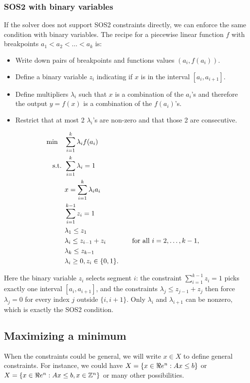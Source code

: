 \subsubsection{SOS2 with binary variables}

If the solver does not support SOS2 constraints directly, we can enforce the same condition with binary variables.  The recipe for a piecewise linear function $f$ with breakpoints $a_1 < a_2 < \dots < a_k$ is:
\begin{itemize}
\item Write down pairs of breakpoints and functions values $(a_i, f(a_i))$.
\item Define a binary variable $z_i$ indicating if $x$ is in the interval $[a_i, a_{i+1}]$.
\item Define multipliers $\lambda_i$ such that $x$ is a combination of the $a_i$'s and therefore the output $y = f(x)$ is a combination of the $f(a_i)$'s.
\item Restrict that at most 2 $\lambda_i$'s are non-zero and that those 2 are consecutive.

\end{itemize}

\begin{align*}
\min \quad & \sum_{i=1}^k \lambda_i f(a_i) \\
\mbox{ s.t. }        & \sum_{i=1}^k \lambda_i = 1 \\
& x = \sum_{i=1}^k \lambda_i a_i \\
& \sum_{i=1}^{k-1} z_i = 1 \\
& \lambda_1 \leq z_1 \\
& \lambda_i \leq z_{i-1} + z_{i} &&\quad \mbox{for all } i=2, \dots, k-1, \\
& \lambda_k \leq z_{k-1} \\
& \lambda_i \geq 0, z_i \in \{0,1\}.
\end{align*}

Here the binary variable $z_i$ selects segment $i$: the constraint $\sum_{i=1}^{k-1} z_i = 1$ picks exactly one interval $[a_i, a_{i+1}]$, and the constraints $\lambda_j \leq z_{j-1} + z_j$ then force $\lambda_j = 0$ for every index $j$ outside $\{i, i+1\}$.  Only $\lambda_i$ and $\lambda_{i+1}$ can be nonzero, which is exactly the SOS2 condition.

\subsection{Maximizing a minimum}
When the constraints could be general, we will write $x \in X$ to define general constraints.  For instance, we could have $X = \{ x \in \Re e^n : Ax \leq b\}$ or $X  = \{ x \in \Re e^n : Ax \leq b, x \in \mathbb{Z}^n\}$ or many other possibilities.  


